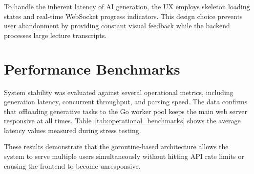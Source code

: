 To handle the inherent latency of AI generation, the UX employs skeleton loading states and real-time WebSocket progress indicators. This design choice prevents user abandonment by providing constant visual feedback while the backend processes large lecture transcripts.

\section{Performance Benchmarks}
System stability was evaluated against several operational metrics, including generation latency, concurrent throughput, and parsing speed. The data confirms that offloading generative tasks to the Go worker pool keeps the main web server responsive at all times. Table~\ref{tab:operational_benchmarks} shows the average latency values measured during stress testing.

\begin{table}[htbp]
\centering
{}
\vspace{6pt}
\caption{Operational benchmarks measuring full-system generation performance.}
\label{tab:operational_benchmarks}
\end{table}

These results demonstrate that the goroutine-based architecture allows the system to serve multiple users simultaneously without hitting API rate limits or causing the frontend to become unresponsive.

